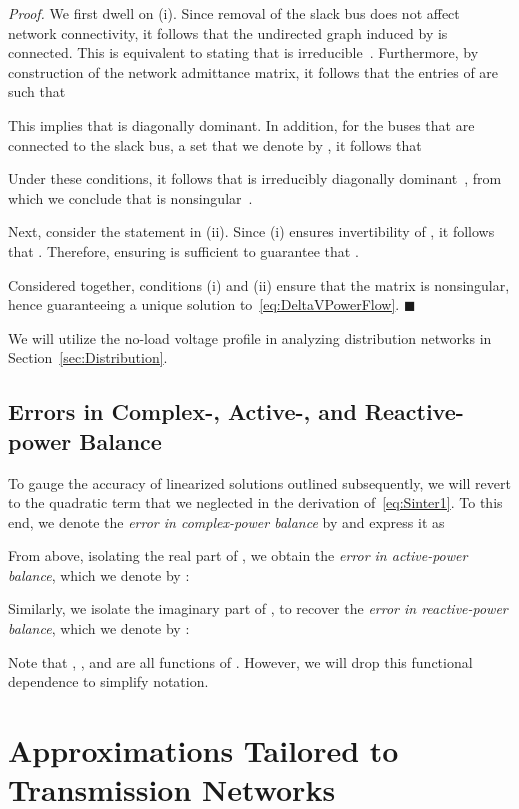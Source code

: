 \documentclass[10 pt, conference]{ieeeconf}
\newcommand{\qedblack}{\hfill \ensuremath{\blacksquare}}
\begin{document}
\noindent \emph{Proof.} We first dwell on (i).  Since removal of the slack bus does not affect network connectivity, it follows that the undirected graph induced by  is connected. This is equivalent to stating that  is irreducible~\cite[Theorem 6.2.24]{Horn:2013}. Furthermore, by construction of the network admittance matrix, it follows that the entries of  are such that

This implies that  is diagonally dominant. In addition, for the buses that are connected to the slack bus, a set that we denote by , it follows that 

Under these conditions, it follows that  is irreducibly diagonally dominant~\cite[Definition 6.2.25]{Horn:2013}, from which we conclude that  is nonsingular~\cite[Corollary 6.2.27]{Horn:2013}. 

Next, consider the statement in (ii). Since (i) ensures invertibility of , it follows that . Therefore, ensuring  is sufficient to guarantee that .	

Considered together, conditions (i) and (ii) ensure that the matrix  is nonsingular, hence guaranteeing a unique solution to~\eqref{eq:DeltaVPowerFlow}. 
\qedblack

We will utilize the no-load voltage profile in analyzing distribution networks in Section~\ref{sec:Distribution}.

\subsection{Errors in Complex-, Active-, and Reactive-power Balance}
To gauge the accuracy of linearized solutions outlined subsequently, we will revert to the quadratic term  that we neglected in the derivation of~\eqref{eq:Sinter1}. To this end, we denote the \emph{error in complex-power balance} by  and express it as

From above, isolating the real part of , we obtain the \emph{error in active-power balance}, which we denote by :

Similarly, we isolate the imaginary part of , to recover the \emph{error in reactive-power balance}, which we denote by :        

Note that , , and  are all functions of . However, we will drop this functional dependence to simplify notation. 

\section{Approximations Tailored to Transmission Networks} \label{sec:Transmission}
\end{document}
